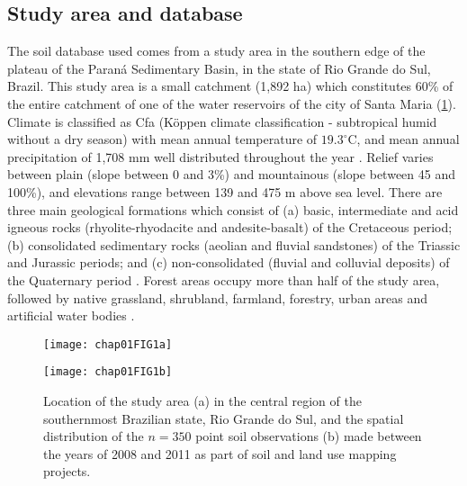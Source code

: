 \subsection{Study area and database}

The soil database used comes from a study area in the southern edge of the plateau of the Paraná 
Sedimentary Basin, in the state of Rio Grande do Sul, Brazil. This study area is a small catchment 
(1,892 ha) which constitutes 60\% of the entire catchment of one of the water reservoirs of the 
city of Santa Maria (\ref{fig:location-intro}). Climate is classified as Cfa (Köppen climate 
classification - subtropical humid without a dry season) with mean annual temperature of 
$19.3^{\circ}$C, and mean annual precipitation of 1,708 mm well distributed throughout the year 
\citep{Maluf2000}. Relief varies between plain (slope between 0 and 3\%) and mountainous (slope 
between 45 and 100\%), and elevations range between 139 and 475 m above sea level. There are three 
main geological formations which consist of (a) basic, intermediate and acid igneous rocks 
(rhyolite-rhyodacite and andesite-basalt) of the Cretaceous period; (b) consolidated sedimentary 
rocks (aeolian and fluvial sandstones) of the Triassic and Jurassic periods; and (c) 
non-consolidated (fluvial and colluvial deposits) of the Quaternary period 
\citep{GasparettoEtAl1988, MacielFilho1990, Sartori2009}. Forest areas occupy more than half of the
study area, followed by native grassland, shrubland, farmland, forestry, urban areas and artificial 
water bodies \citep{SamuelRosaEtAl2011a}.

\begin{figure}[!ht]
    \centering
    \begin{minipage}[b]{95mm}
      \subcaption{}
      \label{fig:brazil}
      \centering
      \texttt{[image: chap01FIG1a]}
    \end{minipage}
    \begin{minipage}[b]{95mm}
      \subcaption{}
      \label{fig:points}
      \centering
      \texttt{[image: chap01FIG1b]}
    \end{minipage}
  \caption{Location of the study area (a) in the central region of the 
  southernmost Brazilian state, Rio Grande do Sul, and the spatial distribution 
  of the $n=350$ point soil observations (b) made between the years of 2008 and
  2011 as part of soil and land use mapping projects.}
  \label{fig:location-intro}
\end{figure}

